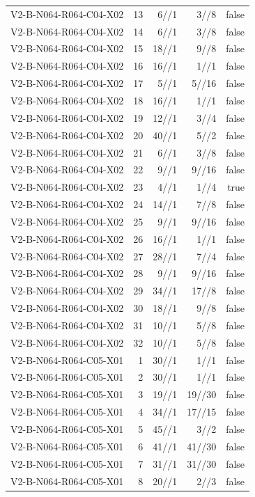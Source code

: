 {\begin{longtable}{lrrrr}
V2-B-N064-R064-C04-X02 & 13 & 6//1 & 3//8 & false \\
V2-B-N064-R064-C04-X02 & 14 & 6//1 & 3//8 & false \\
V2-B-N064-R064-C04-X02 & 15 & 18//1 & 9//8 & false \\
V2-B-N064-R064-C04-X02 & 16 & 16//1 & 1//1 & false \\
V2-B-N064-R064-C04-X02 & 17 & 5//1 & 5//16 & false \\
V2-B-N064-R064-C04-X02 & 18 & 16//1 & 1//1 & false \\
V2-B-N064-R064-C04-X02 & 19 & 12//1 & 3//4 & false \\
V2-B-N064-R064-C04-X02 & 20 & 40//1 & 5//2 & false \\
V2-B-N064-R064-C04-X02 & 21 & 6//1 & 3//8 & false \\
V2-B-N064-R064-C04-X02 & 22 & 9//1 & 9//16 & false \\
V2-B-N064-R064-C04-X02 & 23 & 4//1 & 1//4 & true \\
V2-B-N064-R064-C04-X02 & 24 & 14//1 & 7//8 & false \\
V2-B-N064-R064-C04-X02 & 25 & 9//1 & 9//16 & false \\
V2-B-N064-R064-C04-X02 & 26 & 16//1 & 1//1 & false \\
V2-B-N064-R064-C04-X02 & 27 & 28//1 & 7//4 & false \\
V2-B-N064-R064-C04-X02 & 28 & 9//1 & 9//16 & false \\
V2-B-N064-R064-C04-X02 & 29 & 34//1 & 17//8 & false \\
V2-B-N064-R064-C04-X02 & 30 & 18//1 & 9//8 & false \\
V2-B-N064-R064-C04-X02 & 31 & 10//1 & 5//8 & false \\
V2-B-N064-R064-C04-X02 & 32 & 10//1 & 5//8 & false \\
V2-B-N064-R064-C05-X01 & 1 & 30//1 & 1//1 & false \\
V2-B-N064-R064-C05-X01 & 2 & 30//1 & 1//1 & false \\
V2-B-N064-R064-C05-X01 & 3 & 19//1 & 19//30 & false \\
V2-B-N064-R064-C05-X01 & 4 & 34//1 & 17//15 & false \\
V2-B-N064-R064-C05-X01 & 5 & 45//1 & 3//2 & false \\
V2-B-N064-R064-C05-X01 & 6 & 41//1 & 41//30 & false \\
V2-B-N064-R064-C05-X01 & 7 & 31//1 & 31//30 & false \\
V2-B-N064-R064-C05-X01 & 8 & 20//1 & 2//3 & false \\

\end{longtable}}
